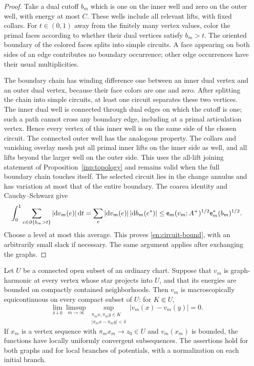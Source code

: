 \begin{proof}
Take a dual cutoff $b_m$ which is one on the inner well and zero on the
outer well, with energy at most $C$.  These wells include all relevant
lifts, with fixed collars.  For $t\in(0,1)$ away from the finitely many
vertex values, color the primal faces according to whether their dual
vertices satisfy $b_m>t$.  The oriented boundary of the colored faces
splits into simple circuits.  A face appearing on both sides of an edge
contributes no boundary occurrence; other edge occurrences have their
usual multiplicities.

The boundary chain has winding difference one between an inner dual
vertex and an outer dual vertex, because their face colors are one and
zero.  After splitting the chain into simple circuits, at least one
circuit separates these two vertices.  The inner dual well is connected
through dual edges on which the cutoff is one; such a path cannot cross
any boundary edge, including at a primal articulation vertex.  Hence
every vertex of this inner well is on the same side of the chosen
circuit.  The connected outer well has the analogous property.  The
collars and vanishing overlay mesh put all primal inner lifts on the
inner side as well, and all lifts beyond the larger well on the outer
side.  This uses the all-lift joining statement of
Proposition~\ref{inp:topology} and remains valid when the full boundary
chain touches itself.  The selected circuit lies in the change annulus
and has variation at most that of the entire boundary.
The coarea identity and Cauchy--Schwarz give
\[
 \int_0^1\sum_{e\in\partial\{b_m>t\}}|\mathrm d v_m(e)|\,\mathrm d t
 =\sum_e |\mathrm d v_m(e)|\,|\mathrm d b_m(e^*)|
 \le \mathsf e_m(v_m;A^+)^{1/2}\mathsf e_m^*(b_m)^{1/2}.
\]
Choose a level at most this average.  This proves
\eqref{en:circuit-bound}, with an arbitrarily small slack if necessary.
The same argument applies after exchanging the graphs.
\end{proof}

\begin{lemma}\label{en:harmonic-compactness}
Let $U$ be a connected open subset of an ordinary chart.  Suppose that
$v_m$ is graph-harmonic at every vertex whose star projects into $U$,
and that its energies are bounded on compactly contained neighborhoods.
Then $v_m$ is macroscopically equicontinuous on every compact subset of
$U$: for $K\Subset U$,
\[
 \lim_{\delta\downarrow0}\limsup_{m\to\infty}
 \sup_{\substack{\pi_m x,\pi_m y\in K\\
                  |\pi_m x-\pi_m y|<\delta}}
                  |v_m(x)-v_m(y)|=0.
\]
If $x_m$ is a vertex sequence with $\pi_mx_m\to z_0\in U$ and
$v_m(x_m)$ is bounded, the functions have locally uniformly convergent
subsequences.  The assertions hold for both graphs and for local
branches of potentials, with a normalization on each initial branch.
\end{lemma}

